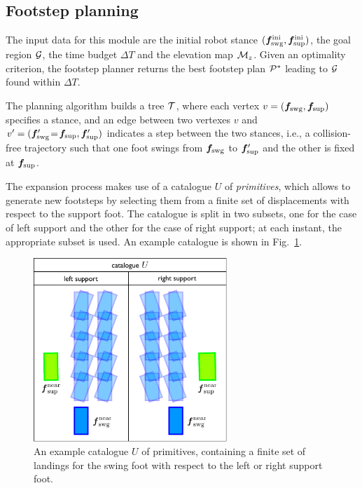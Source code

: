 \subsection{Footstep planning}
\label{sec:WoS:offlineCase:FootstepPlanner}

The input data for this module are the initial robot stance $({\bm{f}}_{\rm swg}^{\rm ini}, {\bm{f}}_{\rm sup}^{\rm ini})$, the goal region $\cal G$, the time budget $\Delta T$ and the elevation map ${\cal M}_z$. Given an optimality criterion, the footstep planner returns the best footstep plan ${\cal P}^*$ leading to $\cal G$ found within $\Delta T$. 

The planning algorithm builds a tree $\cal T$, where each vertex $v = ({\bm{f}}_{\rm swg}, {\bm{f}}_{\rm sup})$ specifies a stance, and an edge between two vertexes $v$ and $v' = ({\bm{f}}'_{\rm swg}\!=\!{\bm{f}}_{\rm sup}, {\bm{f}}'_{\rm sup})$ indicates a step between the two stances, i.e., a collision-free trajectory such that one foot swings from ${\bm{f}}_{\rm swg}$ to ${\bm{f}}'_{\rm sup}$ and the other is fixed at ${\bm{f}}_{\rm sup}$.

The expansion process makes use of a catalogue $U$ of {\em primitives}, which allows to generate new footsteps by selecting them from a finite set of displacements with respect to the support foot. The catalogue is split in two subsets, one for the case of left support  and the other for the case of right support; at each instant, the appropriate subset is used. An example catalogue is shown in Fig.~\ref{fig:WoS:Primitives}.

\begin{figure}
\centering
\includegraphics[width=0.65\textwidth]{figures/Primitives.pdf}
\caption{An example catalogue $U$ of primitives, containing a finite set of landings for the swing foot with respect to the left or right support foot.}
\label{fig:WoS:Primitives}
\end{figure}

